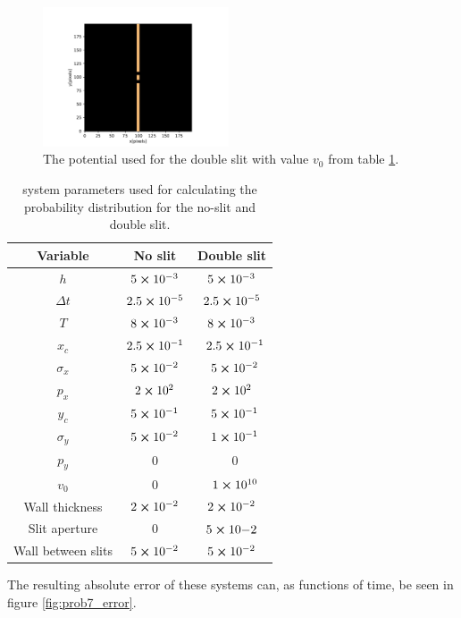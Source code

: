 \documentclass[english,notitlepage,reprint,nofootinbib]{revtex4-2}  %
\begin{document}
	
	\begin{figure}[H]
		\centering
		\includegraphics[trim={2cm 0cm 2cm 1cm},clip,width=0.49\textwidth]{figures/double_slit.pdf}
		\caption{The potential used for the double slit with value $v_0$ from table \ref{tab:1}.}
		\label{fig:potential}
	\end{figure}
	
	\begin{table}[h!]
	\centering
	\caption{system parameters used for calculating the probability distribution for the no-slit and double slit.}
	\label{tab:1}
	\begin{tabular}{c | c | c} %
	 Variable& No slit & Double slit\\
	\hline
	$h$                & $5\cross10^{-3}$                &\quad $5\cross10^{-3}$   \\
	$\Delta t$       & $2.5\cross10^{-5}$            &\quad $2.5\cross10^{-5}$  \\
	$T$                & $8\cross10^{-3}$               &\quad $8\cross10^{-3}$     \\
	$x_c$             & $2.5\cross10^{-1}$            &\quad $2.5\cross10^{-1}$  \\
	$\sigma_x$    & $5\cross10^{-2}$               &\quad $5\cross10^{-2}$     \\
	$p_x$             & $2\cross10^{2}$                &\quad $2\cross10^{2}$      \\
	$y_c$             & $5\cross10^{-1}$               &\quad $5\cross10^{-1}$     \\
	$\sigma_y$    & $5\cross10^{-2}$               &\quad $1\cross10^{-1}$     \\
	$p_y$             & $0$                                    &\quad $0$                         \\
	$v_0$             & $0$                                    &\quad $1\cross10^{10}$    \\
	Wall thickness      & $2\cross10^{-2}$               & $2\cross10^{-2}$        \\
	Slit aperture          & $0$                                     & $5\cross10{-2}$        \\
	Wall between slits & $5\cross10^{-2}$          & $5\cross10^{-2}$            \\
	\hline
	\end{tabular}
	\end{table}
	The resulting absolute error of these systems can, as functions of time, be seen in figure \ref{fig:prob7_error}.
\end{document}
